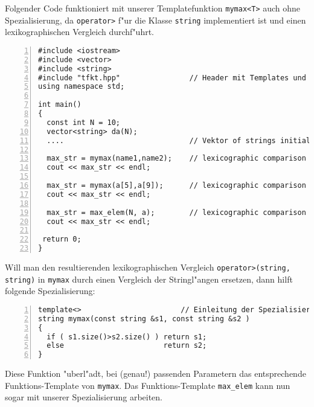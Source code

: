 Folgender Code
funktioniert mit unserer Templatefunktion \verb|mymax<T>| auch ohne Spezialisierung,
da \verb|operator>| f"ur die Klasse \verb|string| implementiert ist und einen lexikographischen
Vergleich durchf"uhrt.
\begin{lstlisting}[caption={Templatefunktion ohne Spezialisierung anwenden.},label=lst:fkt_template_spec_1,
basicstyle=\scriptsize,numbers=left, numberstyle=\tiny, stepnumber=2, numbersep=5pt]
#include <iostream>
#include <vector>
#include <string>
#include "tfkt.hpp"                // Header mit Templates und deren Sources
using namespace std;

int main()
{
  const int N = 10;
  vector<string> da(N);
  ....                             // Vektor of strings initialisieren

  max_str = mymax(name1,name2);	   // lexicographic comparison
  cout << max_str << endl;

  max_str = mymax(a[5],a[9]);      // lexicographic comparison
  cout << max_str << endl;

  max_str = max_elem(N, a);        // lexicographic comparison
  cout << max_str << endl;

 return 0;
}
\end{lstlisting}

Will man den resultierenden lexikographischen Vergleich \verb|operator>(string, string)|  in \verb|mymax| durch
einen Vergleich der Stringl"angen ersetzen, dann hilft folgende Spezialisierung:
\begin{lstlisting}[caption={Spezialisierung einer Templatefunktion.},label=lst:fkt_template_spec_2,
basicstyle=\scriptsize,numbers=left, numberstyle=\tiny, stepnumber=2, numbersep=5pt]
template<>                       // Einleitung der Spezialisierung
string mymax(const string &s1, const string &s2 )
{
  if ( s1.size()>s2.size() ) return s1;
  else                       return s2;
}
\end{lstlisting}
%
Diese Funktion "uberl"adt, bei (genau!) passenden Parametern das entsprechende
Funktions-Template von \verb|mymax|.
Das Funktions-Template \verb|max_elem| kann nun sogar mit unserer Spezialisierung
arbeiten.


%
%
%
%
%
%
%
%
%
%
